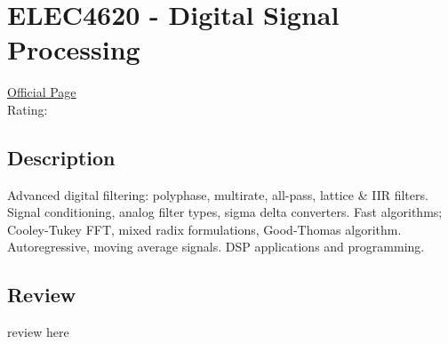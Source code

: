 \hypertarget{ELEC4620}{\section{ELEC4620 - Digital Signal Processing}}

\large
\textcolor{turbo_purple}{\href{https://my.uq.edu.au/programs-courses/course.html?course_code=ELEC4620}{Official Page}} \\
Rating: \cstar\cstar\cstar\cstar\ostar

\normalsize
\subsection*{Description}
Advanced digital filtering: polyphase, multirate, all-pass, lattice \& IIR filters.
Signal conditioning, analog filter types, sigma delta converters.
Fast algorithms; Cooley-Tukey FFT, mixed radix formulations, Good-Thomas algorithm.
Autoregressive, moving average signals. DSP applications and programming.

\subsection*{Review}
review here

